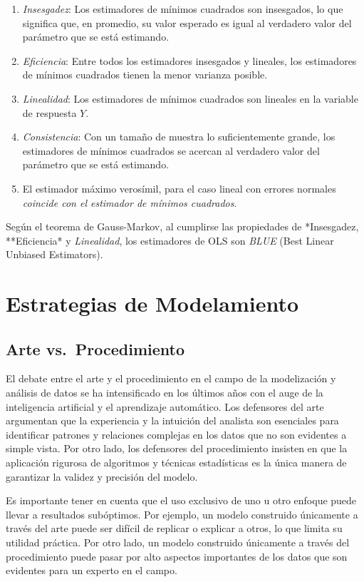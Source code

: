 \documentclass[
]{book}
\begin{document}
\begin{enumerate}
\def\labelenumi{\arabic{enumi}.}
\item
  \emph{Insesgadez}: Los estimadores de mínimos cuadrados son insesgados,
  lo que significa que, en promedio, su valor esperado es igual al
  verdadero valor del parámetro que se está estimando.
\item
  \emph{Eficiencia}: Entre todos los estimadores insesgados y lineales, los
  estimadores de mínimos cuadrados tienen la menor varianza posible.
\item
  \emph{Linealidad}: Los estimadores de mínimos cuadrados son lineales en
  la variable de respuesta \(Y\).
\item
  \emph{Consistencia}: Con un tamaño de muestra lo suficientemente grande,
  los estimadores de mínimos cuadrados se acercan al verdadero valor
  del parámetro que se está estimando.
\item
  El estimador máximo verosímil, para el caso lineal con errores
  normales \emph{coincide con el estimador de mínimos cuadrados}.
\end{enumerate}

Según el teorema de Gauss-Markov, al cumplirse las propiedades de
*Insesgadez, **Eficiencia* y \emph{Linealidad}, los estimadores de OLS
son \emph{BLUE} (Best Linear Unbiased Estimators).

\section{Estrategias de Modelamiento}\label{estrategias-de-modelamiento}

\subsection{Arte vs.~Procedimiento}\label{arte-vs.-procedimiento}

El debate entre el arte y el procedimiento en el campo de la
modelización y análisis de datos se ha intensificado en los últimos años
con el auge de la inteligencia artificial y el aprendizaje automático.
Los defensores del arte argumentan que la experiencia y la intuición del
analista son esenciales para identificar patrones y relaciones complejas
en los datos que no son evidentes a simple vista. Por otro lado, los
defensores del procedimiento insisten en que la aplicación rigurosa de
algoritmos y técnicas estadísticas es la única manera de garantizar la
validez y precisión del modelo.

Es importante tener en cuenta que el uso exclusivo de uno u otro enfoque
puede llevar a resultados subóptimos. Por ejemplo, un modelo construido
únicamente a través del arte puede ser difícil de replicar o explicar a
otros, lo que limita su utilidad práctica. Por otro lado, un modelo
construido únicamente a través del procedimiento puede pasar por alto
aspectos importantes de los datos que son evidentes para un experto en
el campo.
\end{document}
